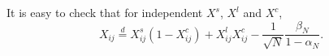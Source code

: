 It is easy to check that for independent $X^s$, $X^l$ and $X^c$,
\begin{equation}
X_{ij} \stackrel{d}{=} X^s_{ij}\left(1-X^c_{ij}\right)+X^l_{ij}X^c_{ij} - \frac{1}{\sqrt{N}}\frac{\beta_N}{1-\alpha_N}. \label{T3}
\end{equation}
